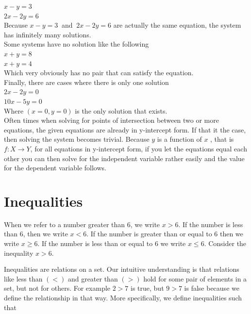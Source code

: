 \documentclass[12pt]{report}
\begin{document}
$x-y=3$\\
$2x-2y=6$\\
Because $x-y=3~$ and $~2x-2y=6$ are actually the same equation, the system has infinitely many solutions.\\
Some systems have no solution like the following\\
$x+y=8$\\
$x+y=4$\\
Which very obviously has no pair that can satisfy the equation.\\
Finally, there are cases where there is only one solution\\
$2x - 2y = 0$\\
$10x - 5y = 0$\\
Where $(x=0, y=0)$ is the only solution that exists.\\

Often times when solving for points of intersection between two or more equations, the given equations are already in y-intercept form. If that it the case, then solving the system becomes trivial. Because $y$ is a function of $x$ , that is $f: X \rightarrow Y$, for all equations in y-intercept form, if you let the equations equal each other you can then solve for the independent variable rather easily and the value for the dependent variable follows.

\section{Inequalities}

\hspace{\parindent}When we refer to a number greater than $6$, we write $x > 6$. If the number is less than 6, then we write $x < 6$. If the number is greater than or equal to 6 then we write $x \geq 6$. If the number is less than or equal to $6$ we write $x \leq 6$. Consider the inequality $x > 6$.

Inequalities are relations on a set. Our intuitive understanding is that relations like less than $(<)$ and greater than $(>)$ hold for some pair of elements in a set, but not for others. For example $2>7$ is true, but $9>7$ is false because we define the relationship in that way. More specifically, we define inequalities such that\bigskip

\end{document}
